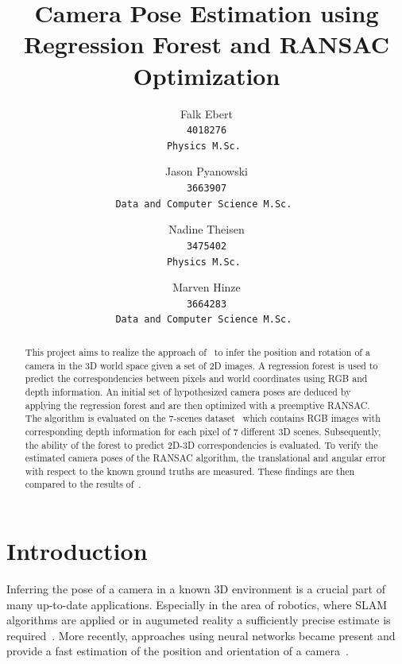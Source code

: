 \documentclass[final]{cvpr}
\begin{document}
\title{Camera Pose Estimation using Regression Forest and RANSAC Optimization}

\author{Falk Ebert\\
\tt 4018276\\
{\tt\small Physics M.Sc.}
\and
Jason Pyanowski\\
\tt 3663907\\
{\tt\small Data and Computer Science M.Sc.}
\and
Nadine Theisen\\
\tt 3475402\\
{\tt\small Physics M.Sc.}
\and
Marven Hinze\\
\tt 3664283\\
{\tt\small Data and Computer Science M.Sc.}
}

\maketitle


\begin{abstract}
This project aims to realize the approach of~\cite{shotton2013} to infer the position and rotation of a camera
in the 3D world space given a set of 2D images. A regression forest is used to predict the correspondencies between 
pixels and world coordinates using RGB and depth information. An initial set of hypothesized camera
poses are deduced by applying the regression forest and are then optimized with a preemptive RANSAC. The algorithm 
is evaluated on the 7-scenes dataset~\cite{glocker2013} which contains RGB images with corresponding depth
information for each pixel of 7 different 3D scenes. Subsequently, the ability of the forest to predict 2D-3D 
correspondencies is evaluated. To verify the estimated camera poses of the RANSAC algorithm, the translational and 
angular error with respect to the known ground truths are measured. These findings are then compared to the results
of~\cite{shotton2013}. 
\end{abstract}

\section{Introduction}
Inferring the pose of a camera in a known 3D environment is a crucial part of many up-to-date applications.
Especially in the area of robotics, where \ac{SLAM} algorithms are applied or in augumeted reality a sufficiently precise 
estimate is required~\cite{shotton2013}. More recently, approaches using neural networks became present and provide
a fast estimation of the position and orientation of a camera~\cite{Blanton2020}. 
\end{document}
